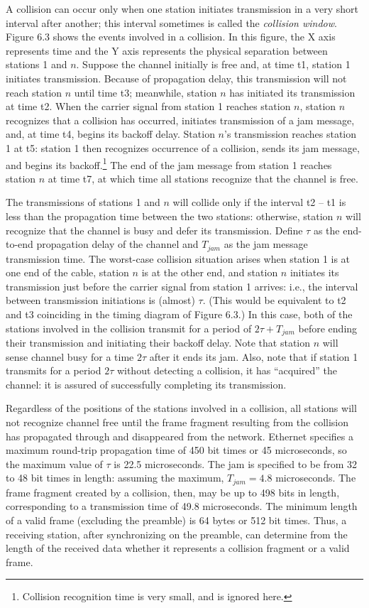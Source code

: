 A collision can occur only when one station initiates transmission in a very short interval after another; this interval sometimes is called the \emph{collision window}. Figure 6.3 shows the events involved in a collision. In this figure, the X axis represents time and the Y axis represents the physical separation between stations 1 and $n$. Suppose the channel initially is free and, at time t1, station 1 initiates transmission. Because of propagation delay, this transmission will not reach station $n$ until time t3; meanwhile, station $n$ has initiated its transmission at time t2. When the carrier signal from station 1 reaches station $n$, station $n$ recognizes that a collision has occurred, initiates transmission of a jam message, and, at time t4, begins its
\noindent backoff delay. Station $n$'s transmission reaches station 1 at t5: station 1 then recognizes occurrence of a collision, sends its jam message, and begins its backoff.\footnote{Collision recognition time is very small, and is ignored here.} The end of the jam message from station 1 reaches station $n$ at time t7, at which time all stations recognize that the channel is free.

The transmissions of stations 1 and $n$ will collide only if the interval t2 -- t1 is less than the propagation time between the two stations: otherwise, station $n$ will recognize that the channel is busy and defer its transmission. Define $\tau$ as the end-to-end propagation delay of the channel and $T_{jam}$ as the jam message transmission time. The worst-case collision situation arises when station 1 is at one end of the cable, station $n$ is at the other end, and station $n$ initiates its transmission just before the carrier signal from station 1 arrives: i.e., the interval between transmission initiations is (almost) $\tau$. (This would be equivalent to t2 and t3 coinciding in the timing diagram of Figure 6.3.) In this case, both of the stations involved in the collision transmit for a period of $2\tau+T_{jam}$ before ending their transmission and initiating their backoff delay. Note that station $n$ will sense channel busy for a time $2\tau$ after it ends its jam. Also, note that if station 1 transmits for a period $2\tau$ without detecting a collision, it has ``acquired'' the channel: it is assured of successfully completing its transmission.

Regardless of the positions of the stations involved in a collision, all stations will not recognize channel free until the frame fragment resulting from the collision has propagated through and disappeared from the network. Ethernet specifies a maximum round-trip propagation time of 450 bit times or 45 microseconds, so the maximum value of $\tau$ is 22.5 microseconds. The jam is specified to be from 32 to 48 bit times in length: assuming the maximum, $T_{jam}=4.8$ microseconds. The frame fragment created by a collision, then, may be up to 498 bits in length, corresponding to a transmission time of 49.8 microseconds. The minimum length of a valid frame (excluding the preamble) is 64 bytes or 512 bit times. Thus, a receiving station, after synchronizing on the preamble, can determine from the length of the received data whether it represents a collision fragment or a valid frame.

